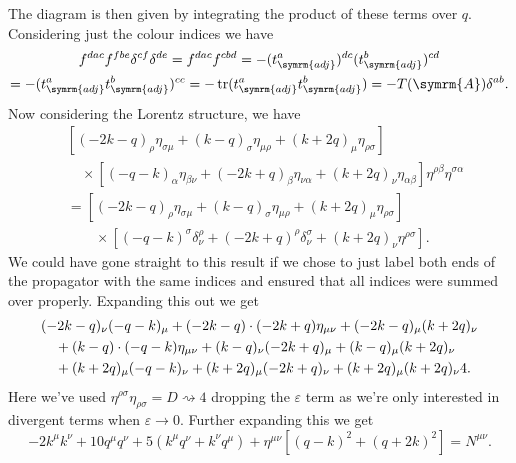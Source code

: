 \documentclass[fleqn]{NotesClass}
\newcommand{\minkowskiMetric}{\eta}
\DeclareMathOperator{\tr}{tr}
\newcommand{\adj}{\symrm{adj}}
\newcommand{\adjointRep}{\symrm{A}}
\begin{document}
    The diagram is then given by integrating the product of these terms over \(q\).
    Considering just the colour indices we have
    \begin{multline}
        f^{dac}f^{fbe}\delta^{cf}\delta^{de} = f^{dac}f^{cbd} = -(t_{\adj}^a)^{dc}(t_{\adj}^{b})^{cd}\\
        = -(t_{\adj}^a t_{\adj}^b)^{cc} = -\tr(t_{\adj}^at_{\adj}^b) = -T(\adjointRep)\delta^{ab}.
    \end{multline}
    Now considering the Lorentz structure, we have
    \begin{align}
        &[(-2k - q)_\rho\minkowskiMetric_{\sigma\mu} + (k - q)_\sigma\minkowskiMetric_{\mu\rho} + (k + 2q)_\mu\minkowskiMetric_{\rho\sigma}]\\
        &\quad\times
        [(-q - k)_\alpha\minkowskiMetric_{\beta\nu} + (-2k + q)_\beta\minkowskiMetric_{\nu\alpha} + (k + 2q)_\nu\minkowskiMetric_{\alpha\beta}]
        \minkowskiMetric^{\rho\beta} \minkowskiMetric^{\sigma\alpha}\\
        &= [(-2k - q)_\rho\minkowskiMetric_{\sigma\mu} + (k - q)_\sigma\minkowskiMetric_{\mu\rho} + (k + 2q)_\mu\minkowskiMetric_{\rho\sigma}]\\
        &\qquad\times [(-q - k)^\sigma \delta^\rho_\nu + (-2k + q)^\rho \delta^\sigma_\nu + (k + 2q)_\nu \minkowskiMetric^{\rho\sigma}].
    \end{align}
    We could have gone straight to this result if we chose to just label both ends of the propagator with the same indices and ensured that all indices were summed over properly.
    Expanding this out we get
    \begin{align}
        &(-2k - q)_\nu(-q - k)_\mu + (-2k - q) \cdot (-2k + q)\minkowskiMetric_{\mu\nu} + (-2k - q)_\mu (k + 2q)_\nu \notag\\
        &\quad + (k - q) \cdot (-q - k) \minkowskiMetric_{\mu\nu} + (k - q)_\nu (-2k + q)_\mu + (k - q)_\mu (k + 2q)_\nu \notag\\
        &\quad + (k + 2q)_\mu (-q - k)_\nu + (k + 2q)_\mu (-2k + q)_\nu + (k + 2q)_\mu (k + 2q)_\nu 4.
    \end{align}
    Here we've used \(\minkowskiMetric^{\rho\sigma}\minkowskiMetric_{\rho\sigma} = D \rightsquigarrow 4\) dropping the \(\varepsilon\) term as we're only interested in divergent terms when \(\varepsilon \to 0\).
    Further expanding this we get
    \begin{equation}
        -2k^\mu k^\nu + 10q^\mu q^\nu + 5(k^\mu q^\nu + k^\nu q^\mu) + \minkowskiMetric^{\mu\nu}[(q - k)^2 + (q + 2k)^2] = N^{\mu\nu}.
    \end{equation}
    
\end{document}
